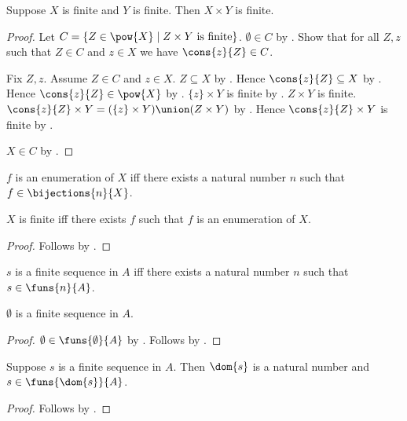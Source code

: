 \begin{theorem}\label{finite_times}
    Suppose $X$ is finite and $Y$ is finite.
    Then $X\times Y$ is finite.
\end{theorem}
\begin{proof}
    Let $C=\{Z\in\pow{X}\mid \text{$Z\times Y$ is finite}\}$.
    $\emptyset\in C$
        by
        .
    Show that for all $Z,z$ such that $Z\in C$ and $z\in X$ we have
        $\cons{z}{Z}\in C$.
    \begin{subproof}
        Fix $Z,z$.
        Assume $Z\in C$ and $z\in X$.
        $Z\subseteq X$ by .
        Hence $\cons{z}{Z}\subseteq X$
            by .
        Hence $\cons{z}{Z}\in\pow{X}$ by .
        $\{z\}\times Y$ is finite
            by .
        $Z\times Y$ is finite.
        $\cons{z}{Z}\times Y
            =(\{z\}\times Y)\union(Z\times Y)$
            by .
        Hence $\cons{z}{Z}\times Y$ is finite
            by .
    \end{subproof}
    $X\in C$ by .
\end{proof}

\begin{definition}\label{enumeration}
    $f$ is an enumeration of $X$ iff there exists a natural number $n$
        such that $f\in\bijections{n}{X}$.
\end{definition}

\begin{proposition}\label{finite_iff_has_enumeration}
    $X$ is finite iff there exists $f$ such that $f$ is an enumeration of $X$.
\end{proposition}
\begin{proof}
    Follows by .
\end{proof}

\begin{definition}\label{finite_sequence}
    $s$ is a finite sequence in $A$ iff there exists a natural number $n$
        such that $s\in\funs{n}{A}$.
\end{definition}

\begin{proposition}\label{emptyset_finite_sequence}
    $\emptyset$ is a finite sequence in $A$.
\end{proposition}
\begin{proof}
    $\emptyset\in\funs{\emptyset}{A}$
        by .
    Follows by .
\end{proof}

\begin{proposition}\label{finite_sequence_domain}
    Suppose $s$ is a finite sequence in $A$.
    Then $\dom{s}$ is a natural number and $s\in\funs{\dom{s}}{A}$.
\end{proposition}
\begin{proof}
    Follows by .
\end{proof}
